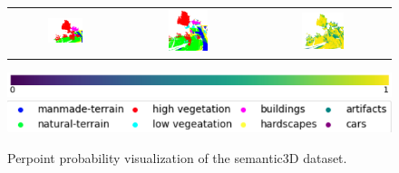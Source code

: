\begin{figure}[h!]
\begin{tabular}{ccc}
            \includegraphics[width=0.33\textwidth, height=0.18\textheight]{images/seg_output/sem3d_seg_output/3_GT.pdf} &
            \includegraphics[width=0.33\textwidth, height=0.18\textheight]{images/seg_output/flipout/sem3d_3.pdf}& 
            \includegraphics[width=0.33\textwidth, height=0.18\textheight]{images/seg_output/flipout/3_fout_prob.pdf}\\
        \end{tabular}
        \includegraphics[scale=0.45]{images/prob_legend.pdf}
        \includegraphics[scale=0.65]{images/legend.png}
        \caption{Perpoint probability visualization of the semantic3D dataset.}
        \label{fig:fout_sem3d_probmap}
    \end{figure}

